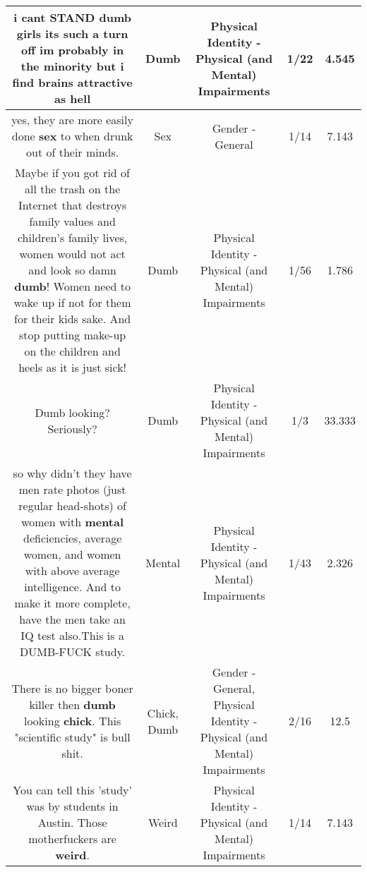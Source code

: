 \documentclass[11pt]{article}
\newlength\mylength
\begin{document}
\begin{center}
\begin{longtable}{|C{.65\mylength}|C{.30\mylength}|C{.12\mylength}|C{.12\mylength}|C{.12\mylength}|}
  \small i cant STAND \textbf{dumb} girls its such a turn off im probably in the minority but i find brains attractive as hell\normalsize   & Dumb & Physical Identity - Physical (and Mental) Impairments & 1/22 & 4.545 \\  \hline
  \small yes, they are more easily done \textbf{sex} to when drunk out of their minds.\normalsize   & Sex & Gender - General & 1/14 & 7.143 \\  \hline
  \small Maybe if you got rid of all the trash on the Internet that destroys family values and children's family lives, women would not act and look so damn \textbf{dumb}! Women need to wake up if not for them for their kids sake. And stop putting make-up on the children and heels as it is just sick!\normalsize   & Dumb & Physical Identity - Physical (and Mental) Impairments & 1/56 & 1.786 \\  \hline
  \small Dumb looking? Seriously?\normalsize   & Dumb & Physical Identity - Physical (and Mental) Impairments & 1/3 & 33.333 \\  \hline
  \small so why didn't they have men rate photos (just regular head-shots) of women with \textbf{mental} deficiencies, average women, and women with above average intelligence.  And to make it more complete, have the men take an IQ test also.This is a DUMB-FUCK study.\normalsize   & Mental & Physical Identity - Physical (and Mental) Impairments & 1/43 & 2.326 \\  \hline
  \small There is no bigger boner killer then \textbf{dumb} looking \textbf{chick}. This "scientific study" is bull shit.\normalsize   & Chick, Dumb & Gender - General, Physical Identity - Physical (and Mental) Impairments & 2/16 & 12.5 \\  \hline
  \small You can tell this 'study' was by students in Austin. Those motherfuckers are \textbf{weird}.\normalsize   & Weird & Physical Identity - Physical (and Mental) Impairments & 1/14 & 7.143 \\  \hline

\end{longtable}
\end{center}
\end{document}
